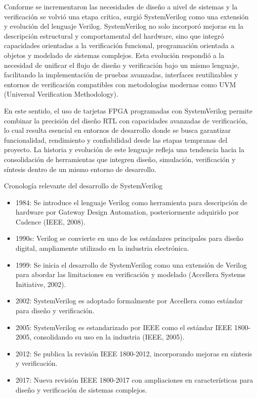 Conforme se incrementaron las necesidades de diseño a nivel de sistemas y la verificación se volvió una etapa crítica, surgió SystemVerilog como una extensión y evolución del lenguaje Verilog. SystemVerilog no solo incorporó mejoras en la descripción estructural y comportamental del hardware, sino que integró capacidades orientadas a la verificación funcional, programación orientada a objetos y modelado de sistemas complejos. Esta evolución respondió a la necesidad de unificar el flujo de diseño y verificación bajo un mismo lenguaje, facilitando la implementación de pruebas avanzadas, interfaces reutilizables y entornos de verificación compatibles con metodologías modernas como UVM (Universal Verification Methodology).

En este sentido, el uso de tarjetas FPGA programadas con SystemVerilog permite combinar la precisión del diseño RTL con capacidades avanzadas de verificación, lo cual resulta esencial en entornos de desarrollo donde se busca garantizar funcionalidad, rendimiento y confiabilidad desde las etapas tempranas del proyecto. La historia y evolución de este lenguaje refleja una tendencia hacia la consolidación de herramientas que integren diseño, simulación, verificación y síntesis dentro de un mismo entorno de desarrollo.

Cronología relevante del desarrollo de SystemVerilog 
\begin{itemize}
\item 1984: Se introduce el lenguaje Verilog como herramienta para descripción de hardware por Gateway Design Automation, posteriormente adquirido por Cadence (IEEE, 2008).
\item 1990s: Verilog se convierte en uno de los estándares principales para diseño digital, ampliamente utilizado en la industria electrónica.
\item 1999: Se inicia el desarrollo de SystemVerilog como una extensión de Verilog para abordar las limitaciones en verificación y modelado (Accellera Systems Initiative, 2002).
\item 2002: SystemVerilog es adoptado formalmente por Accellera como estándar para diseño y verificación.
\item 2005: SystemVerilog es estandarizado por IEEE como el estándar IEEE 1800-2005, consolidando su uso en la industria (IEEE, 2005).
\item 2012: Se publica la revisión IEEE 1800-2012, incorporando mejoras en síntesis y verificación.
\item 2017: Nueva revisión IEEE 1800-2017 con ampliaciones en características para diseño y verificación de sistemas complejos.
\end{itemize}

